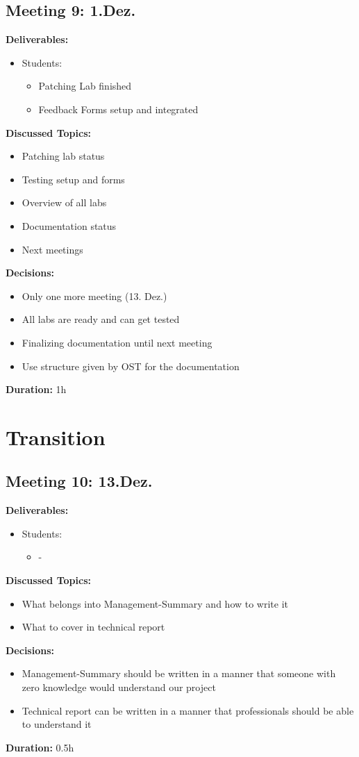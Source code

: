 \subsection*{Meeting 9: 1.Dez.}
\textbf{Deliverables:}
\begin{itemize}
    \item Students:
    \begin{itemize}
        \item Patching Lab finished 
        \item Feedback Forms setup and integrated
    \end{itemize}
\end{itemize} 
\textbf{Discussed Topics:}
\begin{itemize}
    \item Patching lab status 
    \item Testing setup and forms
    \item Overview of all labs
    \item Documentation status
    \item Next meetings
\end{itemize}
\textbf{Decisions:}
\begin{itemize}
    \item Only one more meeting (13. Dez.)
    \item All labs are ready and can get tested
    \item Finalizing documentation until next meeting
    \item Use structure given by OST for the documentation
\end{itemize}
\textbf{Duration:} 1h

\section*{Transition}
\subsection*{Meeting 10: 13.Dez.}
\textbf{Deliverables:}
\begin{itemize}
    \item Students:
    \begin{itemize}
        \item -
    \end{itemize}
\end{itemize} 
\textbf{Discussed Topics:}
\begin{itemize}
    \item What belongs into Management-Summary and how to write it
    \item What to cover in technical report
\end{itemize}
\textbf{Decisions:}
\begin{itemize}
    \item Management-Summary should be written in a manner that someone with zero knowledge would understand our project
    \item Technical report can be written in a manner that professionals should be able to understand it
\end{itemize}
\textbf{Duration:} 0.5h
